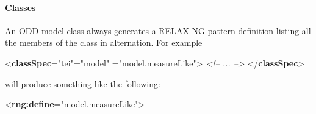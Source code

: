 \paragraph[{Classes}]{Classes}\label{IMCL}\par
An ODD model class always generates a RELAX NG pattern definition listing all the members of the class in alternation. For example \par\bgroup{}\exampleFont \begin{shaded}\noindent\mbox{}{<\textbf{classSpec}\hspace*{1em}{module}="{tei}"\hspace*{1em}{type}="{model}"\mbox{}\newline 
\hspace*{1em}{ident}="{model.measureLike}">}\mbox{}\newline 
\textit{<!-- ... -->}\mbox{}\newline 
{</\textbf{classSpec}>}\end{shaded}\egroup\par \noindent  will produce something like the following: \par\bgroup\exampleFont \begin{shaded}\noindent\mbox{}{<\textbf{rng:define}\hspace*{1em}{name}="{model.measureLike}">}\mbox{}\newline 
{}\mbox{}\newline 
\hspace*{1em}\mbox{}\newline 
\hspace*{1em}\mbox{}\newline 
\hspace*{1em}\mbox{}\newline 
{}\mbox{}\newline 

\end{shaded}
